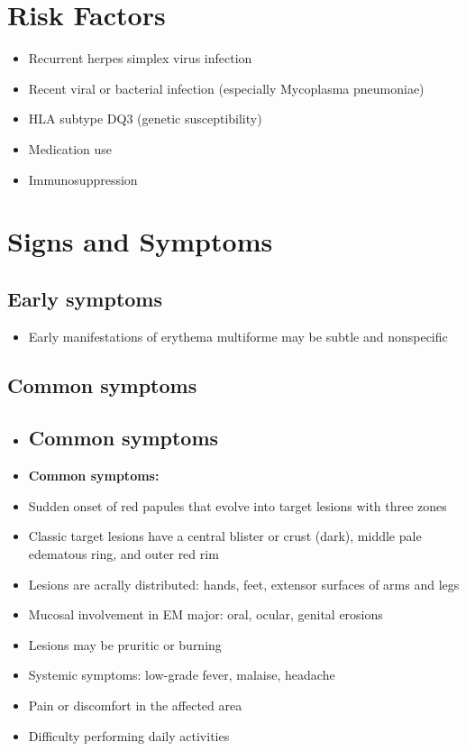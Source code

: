 \section{Risk Factors}

\begin{itemize}[noitemsep]
  \item Recurrent herpes simplex virus infection
  \item Recent viral or bacterial infection (especially Mycoplasma pneumoniae)
  \item HLA subtype DQ3 (genetic susceptibility)
  \item Medication use
  \item Immunosuppression
\end{itemize}

\section{Signs and Symptoms}

\subsection{Early symptoms}
\begin{itemize}[noitemsep]
  \item Early manifestations of erythema multiforme may be subtle and nonspecific
\end{itemize}

\subsection{Common symptoms}
\begin{itemize}[noitemsep]
  \item \subsection{Common symptoms}
  \item \textbf{Common symptoms:}
  \item Sudden onset of red papules that evolve into target lesions with three zones
  \item Classic target lesions have a central blister or crust (dark), middle pale edematous ring, and outer red rim
  \item Lesions are acrally distributed: hands, feet, extensor surfaces of arms and legs
  \item Mucosal involvement in EM major: oral, ocular, genital erosions
  \item Lesions may be pruritic or burning
  \item Systemic symptoms: low-grade fever, malaise, headache
  \item Pain or discomfort in the affected area
  \item Difficulty performing daily activities
\end{itemize}

